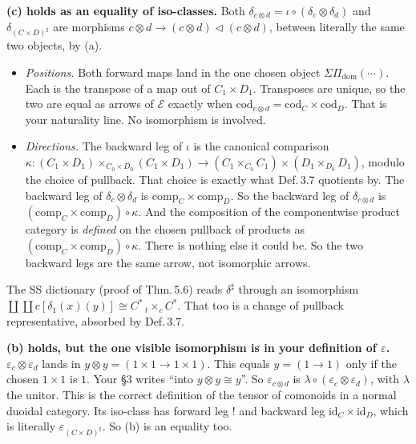 \documentclass[10pt]{amsart}
\newcommand{\tri}{\mathbin{\triangleleft}}
\newcommand{\E}{\mathcal{E}}
\begin{document}
\textbf{(c) holds as an equality of iso-classes.} Both $\delta_{c\otimes d}=\iota\circ(\delta_c\otimes\delta_d)$
and $\delta_{(C\times D)^\sharp}$ are morphisms $c\otimes d\to(c\otimes d)\tri(c\otimes d)$, between literally the
same two objects, by (a).
\begin{itemize}[leftmargin=*]
\item \emph{Positions.} Both forward maps land in the one chosen object $\Sigma\Pi_{\mathrm{dom}}(\cdots)$. Each is
  the transpose of a map out of $C_1\times D_1$. Transposes are unique, so the two are equal as arrows of $\E$
  exactly when $\mathrm{cod}_{c\otimes d}=\mathrm{cod}_C\times\mathrm{cod}_D$. That is your naturality line. No
  isomorphism is involved.
\item \emph{Directions.} The backward leg of $\iota$ is the canonical comparison
  $\kappa\colon(C_1\times D_1)\times_{C_0\times D_0}(C_1\times D_1)\to(C_1\times_{C_0}C_1)\times(D_1\times_{D_0}D_1)$,
  modulo the choice of pullback. That choice is exactly what Def.\,3.7 quotients by. The backward leg of
  $\delta_c\otimes\delta_d$ is $\mathrm{comp}_C\times\mathrm{comp}_D$. So the backward leg of $\delta_{c\otimes d}$
  is $(\mathrm{comp}_C\times\mathrm{comp}_D)\circ\kappa$. And the composition of the componentwise product category
  is \emph{defined} on the chosen pullback of products as $(\mathrm{comp}_C\times\mathrm{comp}_D)\circ\kappa$.
  There is nothing else it could be. So the two backward legs are the same arrow, not isomorphic arrows.
\end{itemize}
The SS dictionary (proof of Thm.\,5.6) reads $\delta^\sharp$ through an isomorphism
$\coprod\coprod c[\delta_1(x)(y)]\cong C^*\,{}_t\!\times_c C^*$. That too is a change of pullback representative,
absorbed by Def.\,3.7.

\textbf{(b) holds, but the one visible isomorphism is in your definition of $\varepsilon$.} $\varepsilon_c\otimes
\varepsilon_d$ lands in $y\otimes y=(1\times1\to1\times1)$. This equals $y=(1\to1)$ only if the chosen $1\times1$ is
$1$. Your \S3 writes ``into $y\otimes y\cong y$''. So $\varepsilon_{c\otimes d}$ is $\lambda\circ(\varepsilon_c
\otimes\varepsilon_d)$, with $\lambda$ the unitor. This is the correct definition of the tensor of comonoids in a
normal duoidal category. Its iso-class has forward leg $!$ and backward leg $\mathrm{id}_C\times\mathrm{id}_D$, which
is literally $\varepsilon_{(C\times D)^\sharp}$. So (b) is an equality too.
\end{document}
